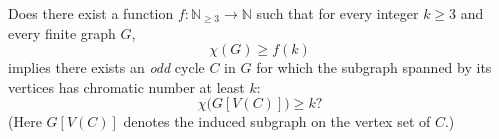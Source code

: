 Does there exist a function $f:\mathbb N_{\ge 3}\to\mathbb N$ such that for every integer $k\ge 3$ and every finite graph $G$,
\[
  \chi(G)\ge f(k)
\]
implies there exists an \emph{odd} cycle $C$ in $G$ for which the subgraph spanned by its vertices has chromatic number at least $k$:
\[
  \chi\bigl(G[V(C)]\bigr)\ge k?
\]
(Here $G[V(C)]$ denotes the induced subgraph on the vertex set of $C$.)
